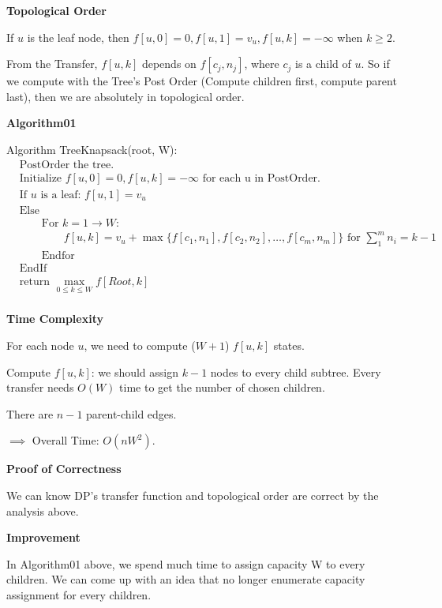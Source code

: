 \documentclass[11pt]{article}
\begin{document}
\textbf{Topological Order}

\qquad If $u$ is the leaf node, then $f[u, 0]=0, f[u, 1]=v_u, f[u, k]=-\infty $ when $k \ge 2$. 

\qquad From the Transfer, $f[u, k]$ depends on $f[c_j, n_j]$, where $c_j$ is a child of $u$. 
So if we compute with the Tree's Post Order (Compute children first, compute parent last), then we are absolutely in topological order. 

\qquad 

\textbf{Algorithm01}

Algorithm TreeKnapsack(root, W): 
\begin{align*}
    & \text{PostOrder the tree. } \\
    & \text{Initialize } f[u, 0]=0, f[u, k]=-\infty \text{ for each u in PostOrder.} \\
    & \text{If } u \text{ is a leaf: } f[u, 1] = v_u \\
    & \text{Else } \\
    & \qquad \text{For } k = 1 \to W :  \\
    & \qquad \qquad f[u, k] = v_u + \max\{f[c_1, n_1], f[c_2, n_2], \dots, f[c_m, n_m]\} \text{ for } \sum_{1}^{m} n_i = k - 1 \\
    & \qquad \text{Endfor} \\
    & \text{EndIf} \\
    & \text{return } \max_{0 \le k \le W} f[Root, k] \\
\end{align*}

\textbf{Time Complexity} 

\qquad For each node $u$, we need to compute ($W+1$) $f[u,k] $ states. 

\qquad Compute $f[u, k]$: we should assign $k-1$ nodes to every child subtree. 
Every transfer needs $O(W)$ time to get the number of chosen children.

\qquad There are $n-1$ parent-child edges. 

\qquad $\implies$ Overall Time: $O(nW^2)$. 

\textbf{Proof of Correctness}

\qquad We can know DP's transfer function and topological order are correct by the analysis above. 

\qquad 

\textbf{Improvement} 

\qquad In Algorithm01 above, we spend much time to assign capacity W to every children. 
We can come up with an idea that no longer enumerate capacity assignment for every children. 
\end{document}
